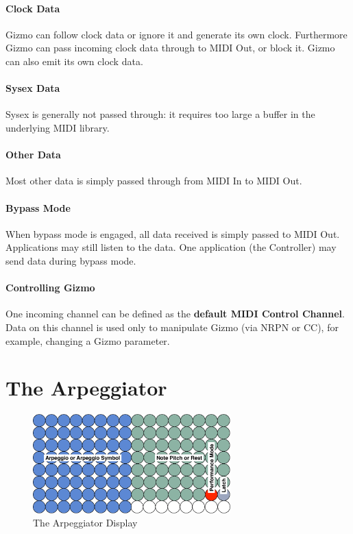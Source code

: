 \documentclass{article}
\begin{document}
\vspace{-0.5em}\paragraph{Clock Data} Gizmo can follow clock data or ignore it and generate its own clock.  Furthermore Gizmo can pass incoming clock data through to MIDI Out, or block it.  Gizmo can also emit its own clock data.

\vspace{-0.5em}\paragraph{Sysex Data} Sysex is generally not passed through: it requires too large a buffer in the underlying MIDI library.

\vspace{-0.5em}\paragraph{Other Data} Most other data is simply passed through from MIDI In to MIDI Out.

\vspace{-0.5em}\paragraph{Bypass Mode} When bypass mode is engaged, all data received is simply passed to MIDI Out.  Applications may still listen to the data.  One application (the Controller) may send data during bypass mode.

\vspace{-0.5em}\paragraph{Controlling Gizmo} One incoming channel can be defined as the {\bf default MIDI Control Channel}.  Data on this channel is used only to manipulate Gizmo (via NRPN or CC), for example, changing a Gizmo parameter.


\clearpage
\section {The Arpeggiator}

\begin{figure}
\vspace{-1.5em}\includegraphics[width=3in]{arpeggio.pdf}
\vspace{-2em}\caption{\small The Arpeggiator Display}\vspace{-1em}
\label{arpeggiator}
\end{figure}
\end{document}
